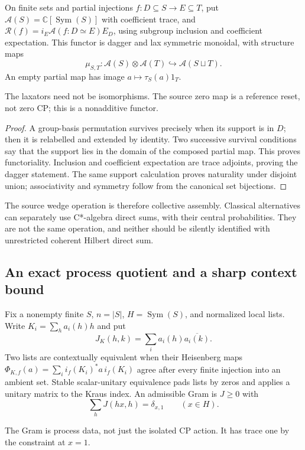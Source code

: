 \begin{theorem}
{\normalfont\statusProved}\quad On finite sets and partial injections
$f:D\subseteq S\to E\subseteq T$, put $\mathcal A(S)=\mathbb C[\operatorname{Sym}(S)]$
with coefficient trace, and
$\mathcal R(f)=i_E\mathcal A(f:D\simeq E)E_D$, using subgroup inclusion
and coefficient expectation. This functor is dagger and lax symmetric
monoidal, with structure maps
\[
\mu_{S,T}:\mathcal A(S)\otimes\mathcal A(T)
\hookrightarrow\mathcal A(S\sqcup T).
\]
An empty partial map has image $a\mapsto\tau_S(a)1_T$.
\end{theorem}
\begin{scope}The laxators need not be isomorphisms. The source zero map
is a reference reset, not zero CP; this is a nonadditive functor.\end{scope}
\begin{proof}
A group-basis permutation survives precisely when its support is in
$D$; then it is relabelled and extended by identity. Two successive
survival conditions say that the support lies in the domain of the
composed partial map. This proves functoriality. Inclusion and coefficient
expectation are trace adjoints, proving the dagger statement. The same
support calculation proves naturality under disjoint union; associativity
and symmetry follow from the canonical set bijections.
\end{proof}

The source wedge operation is therefore collective assembly. Classical
alternatives can separately use C*-algebra direct sums, with their
central probabilities. They are not the same operation, and neither
should be silently identified with unrestricted coherent Hilbert direct sum.

\subsection{An exact process quotient and a sharp context bound}

\begin{definition}
Fix a nonempty finite $S$, $n=|S|$, $H=\operatorname{Sym}(S)$, and
normalized local lists. Write $K_i=\sum_ha_i(h)h$ and put
\[
J_K(h,k)=\sum_i a_i(h)\overline{a_i(k)}.
\]
Two lists are contextually equivalent when their Heisenberg maps
$\Phi_{K,f}(a)=\sum_i i_f(K_i)^*a\,i_f(K_i)$ agree after every finite
injection into an ambient set. Stable scalar-unitary equivalence pads
lists by zeros and applies a unitary matrix to the Kraus index.
An admissible Gram is $J\geq0$ with
\[
\sum_hJ(hx,h)=\delta_{x,1}\qquad(x\in H).
\]
\end{definition}
\begin{scope}The Gram is process data, not just the isolated CP action.
It has trace one by the constraint at $x=1$.\end{scope}

